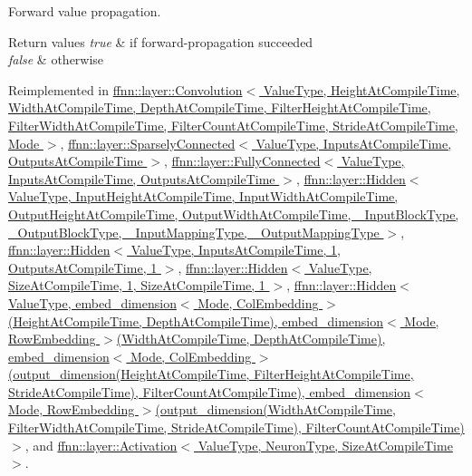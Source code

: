 Forward value propagation. 


\begin{DoxyRetVals}{Return values}
{\em true} & if forward-\/propagation succeeded \\
\hline
{\em false} & otherwise \\
\hline
\end{DoxyRetVals}


Reimplemented in \hyperlink{classffnn_1_1layer_1_1_convolution_a7da09bc158b4c6f61bc02ea3bc6f8cee}{ffnn\-::layer\-::\-Convolution$<$ Value\-Type, Height\-At\-Compile\-Time, Width\-At\-Compile\-Time, Depth\-At\-Compile\-Time, Filter\-Height\-At\-Compile\-Time, Filter\-Width\-At\-Compile\-Time, Filter\-Count\-At\-Compile\-Time, Stride\-At\-Compile\-Time, Mode $>$}, \hyperlink{classffnn_1_1layer_1_1_sparsely_connected_a53f1d9a2edfdd2e47164b24121c23acc}{ffnn\-::layer\-::\-Sparsely\-Connected$<$ Value\-Type, Inputs\-At\-Compile\-Time, Outputs\-At\-Compile\-Time $>$}, \hyperlink{classffnn_1_1layer_1_1_fully_connected_ac49087ab2d66019f2d0244c76987fa50}{ffnn\-::layer\-::\-Fully\-Connected$<$ Value\-Type, Inputs\-At\-Compile\-Time, Outputs\-At\-Compile\-Time $>$}, \hyperlink{classffnn_1_1layer_1_1_hidden_a41fdfb60b5340c0af46c7c731237e280}{ffnn\-::layer\-::\-Hidden$<$ Value\-Type, Input\-Height\-At\-Compile\-Time, Input\-Width\-At\-Compile\-Time, Output\-Height\-At\-Compile\-Time, Output\-Width\-At\-Compile\-Time, \-\_\-\-Input\-Block\-Type, \-\_\-\-Output\-Block\-Type, \-\_\-\-Input\-Mapping\-Type, \-\_\-\-Output\-Mapping\-Type $>$}, \hyperlink{classffnn_1_1layer_1_1_hidden_a41fdfb60b5340c0af46c7c731237e280}{ffnn\-::layer\-::\-Hidden$<$ Value\-Type, Inputs\-At\-Compile\-Time, 1, Outputs\-At\-Compile\-Time, 1 $>$}, \hyperlink{classffnn_1_1layer_1_1_hidden_a41fdfb60b5340c0af46c7c731237e280}{ffnn\-::layer\-::\-Hidden$<$ Value\-Type, Size\-At\-Compile\-Time, 1, Size\-At\-Compile\-Time, 1 $>$}, \hyperlink{classffnn_1_1layer_1_1_hidden_a41fdfb60b5340c0af46c7c731237e280}{ffnn\-::layer\-::\-Hidden$<$ Value\-Type, embed\-\_\-dimension$<$ Mode, Col\-Embedding $>$(\-Height\-At\-Compile\-Time, Depth\-At\-Compile\-Time), embed\-\_\-dimension$<$ Mode, Row\-Embedding $>$(\-Width\-At\-Compile\-Time, Depth\-At\-Compile\-Time), embed\-\_\-dimension$<$ Mode, Col\-Embedding $>$(output\-\_\-dimension(\-Height\-At\-Compile\-Time, Filter\-Height\-At\-Compile\-Time, Stride\-At\-Compile\-Time), Filter\-Count\-At\-Compile\-Time), embed\-\_\-dimension$<$ Mode, Row\-Embedding $>$(output\-\_\-dimension(\-Width\-At\-Compile\-Time, Filter\-Width\-At\-Compile\-Time, Stride\-At\-Compile\-Time), Filter\-Count\-At\-Compile\-Time)$>$}, and \hyperlink{classffnn_1_1layer_1_1_activation_aa7f88c8bc20589dc51d9dd615b8c4580}{ffnn\-::layer\-::\-Activation$<$ Value\-Type, Neuron\-Type, Size\-At\-Compile\-Time $>$}.

